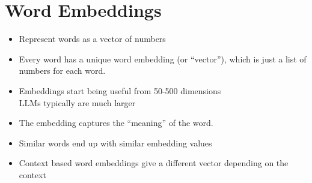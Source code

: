 \documentclass[25pt,a4paper,landscape,headrule,footrule,xetex]{foils}
\begin{document}
\section{Word Embeddings}



\begin{itemize}
\item Represent words as a vector of numbers
\item Every word has a unique word embedding (or “vector”), which is
  just a list of numbers for each word.  
\item Embeddings start being useful from 50-500 dimensions
  \\ LLMs typically are much larger
\item The embedding captures the  “meaning” of the word. 
\item  Similar words end up with similar embedding values
\item Context based word embeddings give a different vector depending
  on the context 

\end{itemize}
\end{document}
